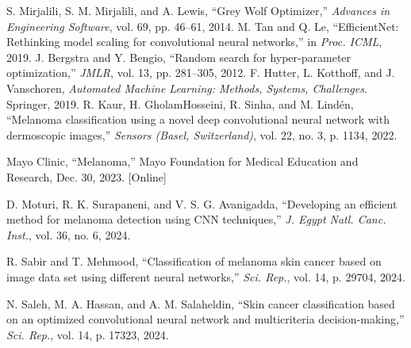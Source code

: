 \documentclass[conference]{IEEEtran}
\begin{document}
\begin{thebibliography}{00}
 S. Mirjalili, S. M. Mirjalili, and A. Lewis, ``Grey Wolf Optimizer,'' \textit{Advances in Engineering Software}, vol. 69, pp. 46–61, 2014.
 M. Tan and Q. Le, ``EfficientNet: Rethinking model scaling for convolutional neural networks,'' in \textit{Proc. ICML}, 2019.
 J. Bergstra and Y. Bengio, ``Random search for hyper-parameter optimization,'' \textit{JMLR}, vol. 13, pp. 281–305, 2012.
 F. Hutter, L. Kotthoff, and J. Vanschoren, \textit{Automated Machine Learning: Methods, Systems, Challenges}. Springer, 2019.
 R. Kaur, H. GholamHosseini, R. Sinha, and M. Lindén, ``Melanoma classification using a novel deep convolutional neural network with dermoscopic images,'' \textit{Sensors (Basel, Switzerland)}, vol. 22, no. 3, p. 1134, 2022.

 Mayo Clinic, ``Melanoma,'' Mayo Foundation for Medical Education and Research, Dec. 30, 2023. [Online]

 D. Moturi, R. K. Surapaneni, and V. S. G. Avanigadda, ``Developing an efficient method for melanoma detection using CNN techniques,'' \textit{J. Egypt Natl. Canc. Inst.}, vol. 36, no. 6, 2024.

 R. Sabir and T. Mehmood, ``Classification of melanoma skin cancer based on image data set using different neural networks,'' \textit{Sci. Rep.}, vol. 14, p. 29704, 2024.

 N. Saleh, M. A. Hassan, and A. M. Salaheldin, ``Skin cancer classification based on an optimized convolutional neural network and multicriteria decision-making,'' \textit{Sci. Rep.}, vol. 14, p. 17323, 2024.


\end{thebibliography}
\end{document}
